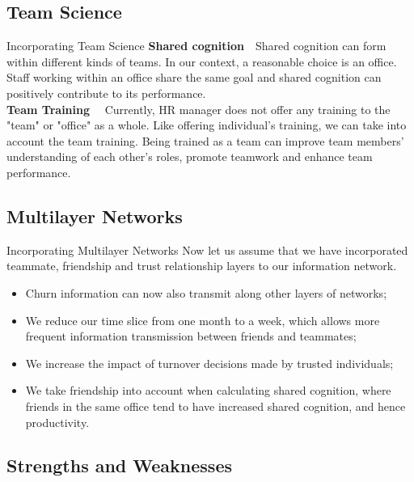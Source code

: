 \documentclass{beamer}
\begin{document}
\subsection{Team Science}
\begin{frame}{Incorporating Team Science}
\textbf{Shared cognition}\ \  Shared cognition can form within different kinds of teams. In our context, a reasonable choice is an office. Staff working within an office share the same goal and shared cognition can positively contribute to its performance.\\\vspace{0.5em}
\textbf{Team Training} \ \ Currently, HR manager does not offer any training to the "team" or "office" as a whole. Like offering individual's training, we can take into account the team training. Being trained as a team can improve team members' understanding of each other's roles, promote teamwork and enhance team performance.
\end{frame}

\subsection{Multilayer Networks}
\begin{frame}{Incorporating Multilayer Networks}
Now let us assume that we have incorporated teammate, friendship and trust relationship layers to our information network.

\begin{itemize}
\item Churn information can now also transmit along other layers of networks;
\item We reduce our time slice from one month to a week, which allows more frequent information transmission between friends and teammates;
\item We increase the impact of turnover decisions made by trusted individuals;
\item We take friendship into account when calculating shared cognition, where friends in the same office tend to have increased shared cognition, and hence productivity.

\end{itemize}

\end{frame}

\subsection{Strengths and Weaknesses}
\end{document}
